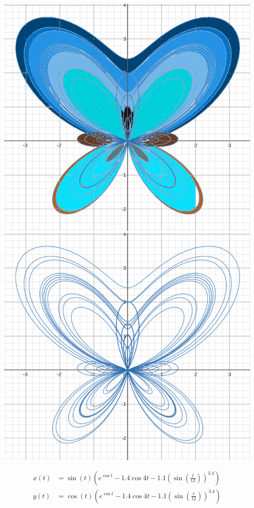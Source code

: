 \documentclass{article}
\begin{document}
\begin{itemize}
	\begin{center}
		\centering
		\includegraphics*[width=0.49\linewidth]{art.png}
		\includegraphics*[width=0.49\linewidth]{art2.png}

		\fontsize{12pt}{12pt}\selectfont
		\begin{align*}
			x(t)&=\sin(t)\left(e^{\cos t}-1.4\cos4t-1.1\left(\sin\left(\frac{t}{12}\right)\right)^{3.4}\right) \\
			y(t)&=\cos(t)\left(e^{\cos t}-1.4\cos4t-1.1\left(\sin\left(\frac{t}{12}\right)\right)^{3.4}\right)
		\end{align*}
	\end{center}

	
\end{itemize}
\end{document}
